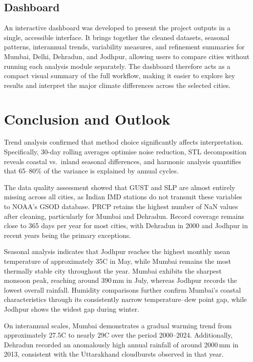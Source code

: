 \subsection{Dashboard}

An interactive dashboard was developed to present the project outputs in a single,
accessible interface.
It brings together the cleaned datasets, seasonal patterns, interannual trends,
variability measures, and refinement summaries for Mumbai, Delhi, Dehradun, and
Jodhpur, allowing users to compare cities without running each analysis module
separately.
The dashboard therefore acts as a compact visual summary of the full workflow,
making it easier to explore key results and interpret the major climate differences
across the selected cities.
\section{Conclusion and Outlook}

Trend analysis confirmed that method choice significantly affects interpretation. 
Specifically, 30-day rolling averages optimise noise reduction, STL decomposition 
reveals coastal vs.\ inland seasonal differences, and harmonic analysis quantifies 
that 65--80\% of the variance is explained by annual cycles.

The data quality assessment showed that GUST and SLP are almost entirely missing 
across all cities, as Indian IMD stations do not transmit these variables to 
NOAA's GSOD database. PRCP retains the highest number of NaN values after cleaning, 
particularly for Mumbai and Dehradun. Record coverage remains close to 365 days 
per year for most cities, with Dehradun in 2000 and Jodhpur in recent years 
being the primary exceptions.

Seasonal analysis indicates that Jodhpur reaches the highest monthly mean 
temperature of approximately 35\textdegree C in May, while Mumbai remains the most 
thermally stable city throughout the year. Mumbai exhibits the sharpest monsoon 
peak, reaching around 390\,mm in July, whereas Jodhpur records the lowest overall 
rainfall. Humidity comparisons further confirm Mumbai's coastal characteristics 
through its consistently narrow temperature--dew point gap, while Jodhpur shows 
the widest gap during winter. 

On interannual scales, Mumbai demonstrates a gradual warming trend from 
approximately 27.5\textdegree C to nearly 29\textdegree C over the period 
2000--2024. Additionally, Dehradun recorded an anomalously high annual rainfall 
of around 2000\,mm in 2013, consistent with the Uttarakhand cloudbursts 
observed in that year.

